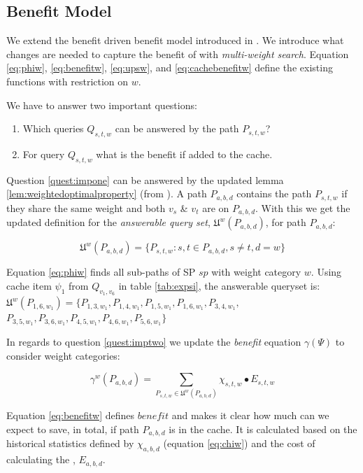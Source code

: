 \subsection{Benefit Model}

We extend the benefit driven benefit model introduced in \cite{thomsen2012}. We introduce what changes are needed to capture the benefit of \spaths with \textit{multi-weight search}.
Equation \ref{eq:phiw}, \ref{eq:benefitw}, \ref{eq:upsw}, and \ref{eq:cachebenefitw} define the existing functions with restriction on $w$.


We have to answer two important questions:
\begin{enumerate}
\item \label{quest:impone} Which queries $Q_{s,t,w}$ can be answered by the path $P_{s,t,w}$?
\item \label{quest:imptwo} For query $Q_{s,t,w}$ what is the benefit if added to the cache.
\end{enumerate}

Question \ref{quest:impone} can be answered by the updated lemma \ref{lem:weightedoptimalproperty} (from \cite{thomsen2012}). A path $P_{a,b,d}$ contains the path $P_{s,t,w}$ if they share the same weight and both $v_s$ \& $v_t$ are on $P_{a,b,d}$. With this we get the updated definition for the \textit{answerable query set}, $\mathfrak{U}^w(P_{a,b,d})$, for path $P_{a,b,d}$:

\begin{equation} \label{eq:phiw}
\mathfrak{U}^w(P_{a,b,d}) = \{ P_{s,t,w} : s, t \in P_{a,b,d},  s \neq t,  d = w\}
\end{equation}

Equation \ref{eq:phiw} finds all sub-paths of SP $sp$ with weight category $w$. Using cache item $\psi_1$ from $Q_{v_1,v_6}$ in table \ref{tab:expsi}, the answerable queryset is: $\mathfrak{U}^w(P_{1,6,w_1}) = \{P_{1,3,w_1},P_{1,4,w_1},P_{1,5,w_1},P_{1,6,w_1},P_{3,4,w_1},$ $P_{3,5,w_1},P_{3,6,w_1},P_{4,5,w_1},P_{4,6,w_1},P_{5,6,w_1}\}$ 


In regards to question \ref{quest:imptwo} we update the \textit{benefit} equation $\gamma(\Psi)$ to consider weight categories:

\begin{equation} \label{eq:benefitw}
\gamma^w(P_{a,b,d}) = \sum\limits_{P_{s,t,w} \in \mathfrak{U}^w(P_{a,b,d})} \chi_{s,t,w} \bullet E_{s,t,w}
\end{equation}

Equation \ref{eq:benefitw} defines $benefit$ and makes it clear how much can we expect to save, in total, if path $P_{a,b,d}$ is in the cache. It is calculated based on the historical statistics defined by $\chi_{a,b,d}$ (equation \ref{eq:chiw}) and the cost of calculating the \spathns, $E_{a,b,d}$.


